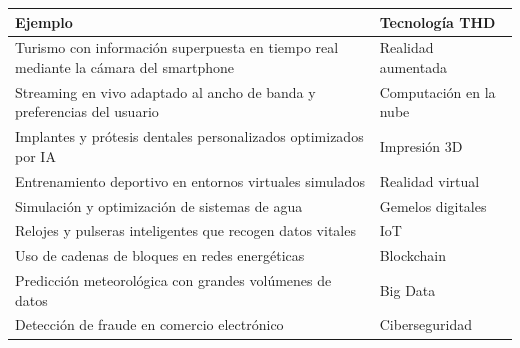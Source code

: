 

\begin{solution}
\centering
\begin{tabular}{|p{9cm}|p{4cm}|}
\hline
\textbf{Ejemplo} & \textbf{Tecnología THD} \\
\hline
Turismo con información superpuesta en tiempo real mediante la cámara del smartphone & Realidad aumentada \\
\hline
Streaming en vivo adaptado al ancho de banda y preferencias del usuario & Computación en la nube \\
\hline
Implantes y prótesis dentales personalizados optimizados por IA & Impresión 3D \\
\hline
Entrenamiento deportivo en entornos virtuales simulados & Realidad virtual \\
\hline
Simulación y optimización de sistemas de agua & Gemelos digitales \\
\hline
Relojes y pulseras inteligentes que recogen datos vitales & IoT \\
\hline
Uso de cadenas de bloques en redes energéticas & Blockchain \\
\hline
Predicción meteorológica con grandes volúmenes de datos & Big Data \\
\hline
Detección de fraude en comercio electrónico & Ciberseguridad \\
\hline
\end{tabular}

\end{solution}
